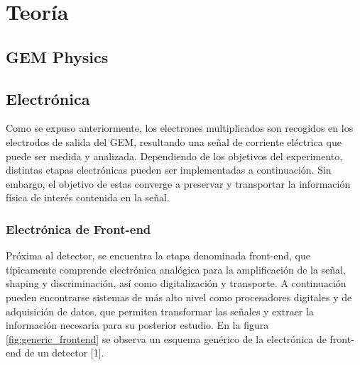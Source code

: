 \documentclass[]{book}
\begin{document}

\chapter*{Teoría}

\section{GEM Physics}


\section{Electrónica}

\noindent Como se expuso anteriormente, los electrones multiplicados son recogidos en los electrodos de salida del GEM, resultando una señal de corriente eléctrica que puede ser medida y analizada. Dependiendo de los objetivos del experimento, distintas etapas electrónicas pueden ser implementadas a continuación. Sin embargo, el objetivo de estas converge a preservar y transportar la información física de interés contenida en la señal. \\

\subsection{Electrónica de Front-end}

\noindent Próxima al detector, se encuentra la etapa denominada front-end, que típicamente comprende electrónica analógica para la amplificación de la señal, shaping y discriminación, así como digitalización y transporte. A continuación pueden encontrarse sistemas de más alto nivel como procesadores digitales y de adquisición de datos, que permiten transformar las señales y extraer la información necesaria para su posterior estudio. En la figura \ref{fig:generic_frontend} se observa un esquema genérico de la electrónica de front-end de un detector [1].\\
\end{document}
